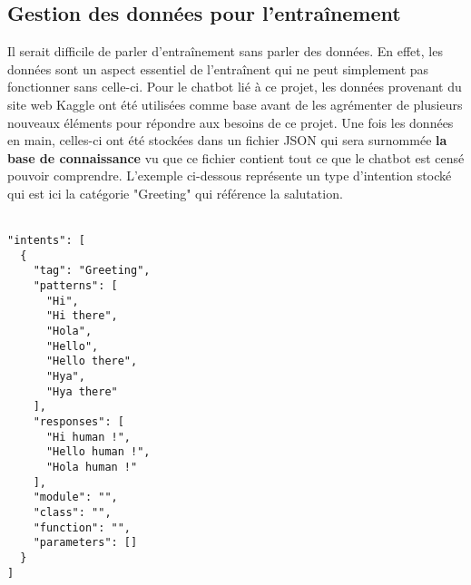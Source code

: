 \documentclass{rapport}
\begin{document}
\subsection{Gestion des données pour l'entraînement}
\label{subsec:data}
Il serait difficile de parler d'entraînement sans parler des données. En effet, les données sont un aspect essentiel de l'entraînent qui ne peut simplement pas fonctionner sans celle-ci. Pour le chatbot lié à ce projet, les données provenant du site web Kaggle  ont été utilisées comme base avant de les agrémenter de plusieurs nouveaux éléments pour répondre aux besoins de ce projet. Une fois les données en main, celles-ci ont été stockées dans un fichier JSON qui sera surnommée \textbf{la base de connaissance }vu que ce fichier contient tout ce que le chatbot est censé pouvoir comprendre. L'exemple ci-dessous représente un type d'intention stocké qui est ici la catégorie "Greeting" qui référence la salutation.\\\\
\begin{minipage}{0.25\textwidth}
    \begin{verbatim}
"intents": [
  {
    "tag": "Greeting",
    "patterns": [
      "Hi",
      "Hi there",
      "Hola",
      "Hello",
      "Hello there",
      "Hya",
      "Hya there"
    ],
    "responses": [
      "Hi human !",
      "Hello human !",
      "Hola human !"
    ],
    "module": "",
    "class": "",
    "function": "",
    "parameters": []
  }
]
\end{verbatim}
\end{minipage}
\hfill
\vspace{0.1cm}
\vrule
\vspace{0.1cm}
\end{document}
